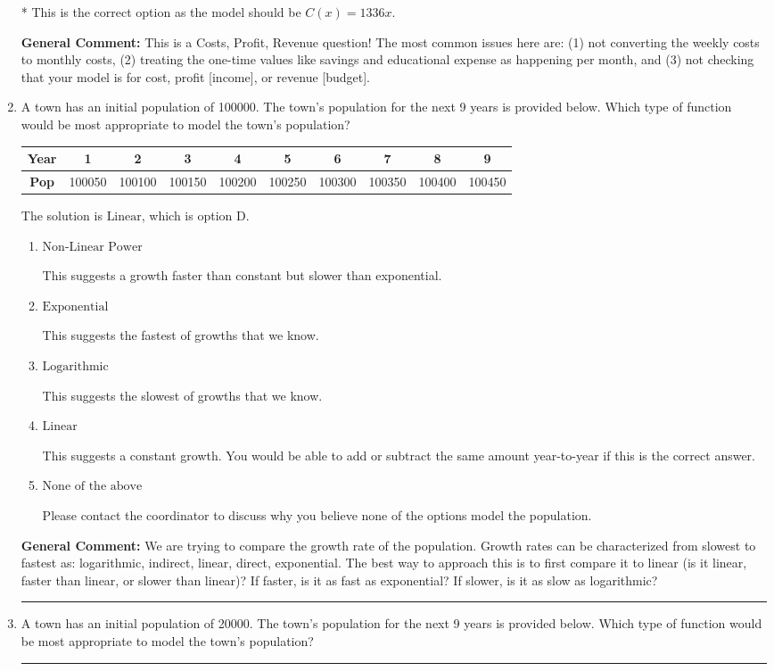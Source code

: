 \documentclass{extbook}[14pt]
\newcommand{\litem}[1]{\item #1

\rule{\textwidth}{0.4pt}}
\begin{document}
\begin{enumerate}
{\begin{enumerate}[label=\Alph*.]
* This is the correct option as the model should be $C(x) = 1336 x$.
\end{enumerate}

\textbf{General Comment:} This is a Costs, Profit, Revenue question! The most common issues here are: (1) not converting the weekly costs to monthly costs, (2) treating the one-time values like savings and educational expense as happening per month, and (3) not checking that your model is for cost, profit [income], or revenue [budget].
}
\litem{
A town has an initial population of 100000. The town's population for the next 9 years is provided below. Which type of function would be most appropriate to model the town's population?


\begin{tabular}{c|c|c|c|c|c|c|c|c|c}
\textbf{Year} &1 &2 &3 &4 &5 &6 &7 &8 &9\tabularnewline \hline
\textbf{Pop} &100050 &100100 &100150 &100200 &100250 &100300 &100350 &100400 &100450\end{tabular}The solution is \( \text{Linear} \), which is option D.\begin{enumerate}[label=\Alph*.]
\item \( \text{Non-Linear Power} \)

This suggests a growth faster than constant but slower than exponential.
\item \( \text{Exponential} \)

This suggests the fastest of growths that we know.
\item \( \text{Logarithmic} \)

This suggests the slowest of growths that we know.
\item \( \text{Linear} \)

This suggests a constant growth. You would be able to add or subtract the same amount year-to-year if this is the correct answer.
\item \( \text{None of the above} \)

Please contact the coordinator to discuss why you believe none of the options model the population.
\end{enumerate}

\textbf{General Comment:} We are trying to compare the growth rate of the population. Growth rates can be characterized from slowest to fastest as: logarithmic, indirect, linear, direct, exponential. The best way to approach this is to first compare it to linear (is it linear, faster than linear, or slower than linear)? If faster, is it as fast as exponential? If slower, is it as slow as logarithmic?
}
\litem{
A town has an initial population of 20000. The town's population for the next 9 years is provided below. Which type of function would be most appropriate to model the town's population?


}
\end{enumerate}
\end{document}

